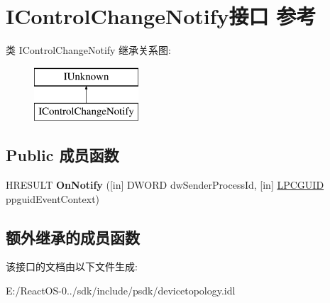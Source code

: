 \hypertarget{interface_i_control_change_notify}{}\section{I\+Control\+Change\+Notify接口 参考}
\label{interface_i_control_change_notify}
类 I\+Control\+Change\+Notify 继承关系图\+:\begin{figure}[H]
\begin{center}
\leavevmode
\includegraphics[height=2.000000cm]{interface_i_control_change_notify}
\end{center}
\end{figure}
\subsection*{Public 成员函数}
\begin{DoxyCompactItemize}
\item 
\mbox{\label{interface_i_control_change_notify_af8ae272dc34791e677f76cb548ee5bc6}} 
H\+R\+E\+S\+U\+LT {\bfseries On\+Notify} (\mbox{[}in\mbox{]} D\+W\+O\+RD dw\+Sender\+Process\+Id, \mbox{[}in\mbox{]} \hyperlink{interface_g_u_i_d}{L\+P\+C\+G\+U\+ID} ppguid\+Event\+Context)
\end{DoxyCompactItemize}
\subsection*{额外继承的成员函数}


该接口的文档由以下文件生成\+:\begin{DoxyCompactItemize}
\item 
E\+:/\+React\+O\+S-\/0../sdk/include/psdk/devicetopology.\+idl\end{DoxyCompactItemize}
